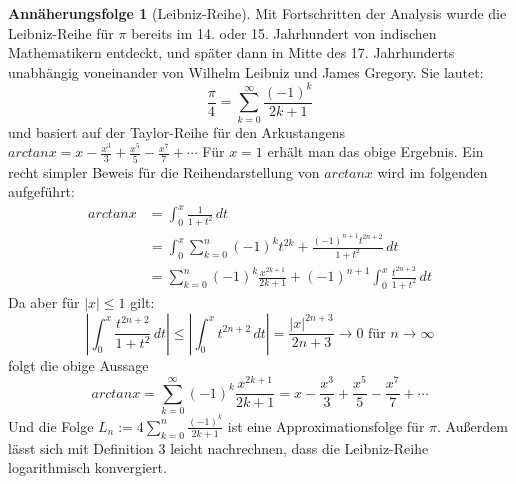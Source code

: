 \documentclass{scrartcl}
\theoremstyle{definition}
\newtheorem{approximation sequence}{Annäherungsfolge}
\begin{document}
\begin{approximation sequence}[Leibniz-Reihe]
Mit Fortschritten der Analysis wurde die Leibniz-Reihe für \(\pi\) bereits im 14. 
oder 15. Jahrhundert von indischen Mathematikern entdeckt, und später dann in 
Mitte des 17. Jahrhunderts unabhängig voneinander von Wilhelm Leibniz und James Gregory.
Sie lautet:
\[ \frac{\pi}{4} = \sum_{k=0}^{\infty} \frac{(-1)^k}{2k+1} \]
und basiert auf der Taylor-Reihe für den Arkustangens \(arctanx = x - \frac{x^3}{3} + \frac{x^5}{5} - \frac{x^7}{7} + \cdots \)
Für \(x = 1\) erhält man das obige Ergebnis.
Ein recht simpler Beweis für die Reihendarstellung von \(arctanx\) wird im folgenden aufgeführt: \cite{Leibniz}
\begin{equation} 
    \begin{split}
    arctanx & = \int_{0}^{x} \frac{1}{1+t^2}\,dt \\
    & = \int_{0}^{x}\sum_{k=0}^{n}(-1)^k t^{2k} + \frac{(-1)^{n+1}t^{2n+2}}{1+t^2}\,dt \\
    & = \sum_{k=0}^{n}(-1)^k \frac{x^{2k+1}}{2k+1} + (-1)^{n+1}\int_{0}^{x}\frac{t^{2n+2}}{1+t^2}\,dt
    \end{split}
    \end{equation}
Da aber für \(|x| \leqslant 1\) gilt: \[|\int_{0}^{x}\frac{t^{2n+2}}{1+t^2}\,dt| \leqslant |\int_{0}^{x}t^{2n+2}\,dt| = \frac{|x|^{2n+3}}{2n+3} \rightarrow 0 \text{ für } n \rightarrow \infty \]
folgt die obige Aussage
\[arctanx = \sum_{k=0}^{\infty}(-1)^k \frac{x^{2k+1}}{2k+1} = x - \frac{x^3}{3} + \frac{x^5}{5} - \frac{x^7}{7} + \cdots \] 
Und die Folge \(L_n := 4\sum_{k=0}^{n} \frac{(-1)^k}{2k+1} \) ist eine Approximationsfolge für \(\pi\).
Außerdem lässt sich mit Definition 3 leicht nachrechnen, dass die Leibniz-Reihe logarithmisch konvergiert. 
\end{approximation sequence}
\end{document}
